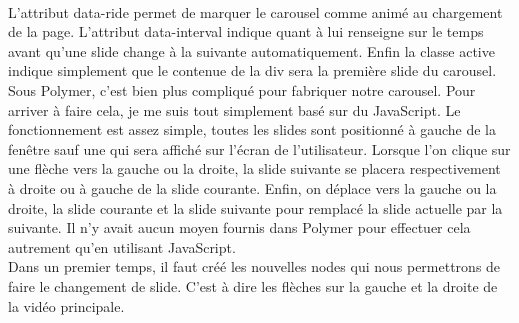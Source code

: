 \documentclass{article}
\begin{document}
\vspace{0.5cm}\\ 
L'attribut \og data-ride \fg{} permet de marquer le carousel comme anim\'e au chargement de la page. L'attribut \og data-interval \fg{} indique quant \`a lui renseigne sur le temps avant qu'une slide change \`a la suivante automatiquement. Enfin la classe \og active \fg{} indique simplement que le contenue de la div sera la premi\`ere slide du carousel.\\
Sous Polymer, c'est bien plus compliqu\'e pour fabriquer notre carousel. Pour arriver \`a faire cela, je me suis tout simplement bas\'e sur du JavaScript. Le fonctionnement est assez simple, toutes les slides sont positionn\'e \`a gauche de la fen\^etre sauf une qui sera affich\'e sur l'\'ecran de l'utilisateur. Lorsque l'on clique sur une fl\`eche vers la gauche ou la droite, la slide suivante se placera respectivement \`a droite ou \`a gauche de la slide courante. Enfin, on d\'eplace vers la gauche ou la droite, la slide courante et la slide suivante pour remplac\'e la slide actuelle par la suivante. Il n'y avait aucun moyen fournis dans Polymer pour effectuer cela autrement qu'en utilisant JavaScript.\\
Dans un premier temps, il faut cr\'e\'e les nouvelles nodes qui nous permettrons de faire le changement de slide. C'est \`a dire les fl\`eches sur la gauche et la droite de la vid\'eo principale.
\vspace{0.5cm}\\
\end{document}
